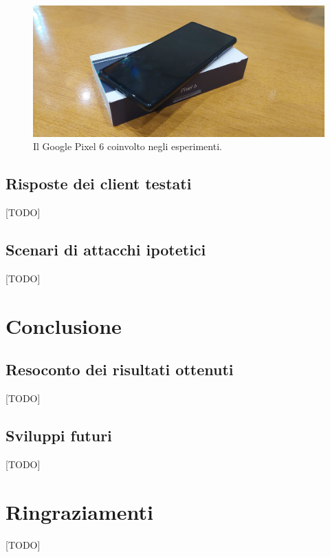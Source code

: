 \documentclass[10pt, oneside]{book}
\begin{document}
\begin{figure}
\includegraphics[width=\linewidth]{pixel6.png}
\caption{Il Google Pixel 6 coinvolto negli esperimenti.}
\label{fig:pixel6}
\end{figure}

\section{Risposte dei client testati}
[TODO]

\section{Scenari di attacchi ipotetici}
[TODO]

\chapter{Conclusione}
\section{Resoconto dei risultati ottenuti}
[TODO]

\section{Sviluppi futuri}
[TODO]



\chapter*{Ringraziamenti}
[TODO]
\end{document}
